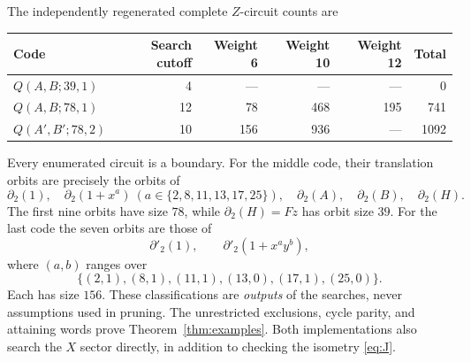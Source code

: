 The independently regenerated complete $Z$-circuit counts are
\begin{center}
\begin{tabular}{lrrrrr}
\toprule
Code & Search cutoff & Weight 6 & Weight 10 & Weight 12 & Total\\
\midrule
$Q(A,B;39,1)$ & 4 & --- & --- & --- & 0\\
$Q(A,B;78,1)$ & 12 & 78 & 468 & 195 & 741\\
$Q(A',B';78,2)$ & 10 & 156 & 936 & --- & 1092\\
\bottomrule
\end{tabular}
\end{center}
Every enumerated circuit is a boundary. For the middle code, their translation orbits are precisely the orbits of
\[
 \partial_2(1),\quad
 \partial_2(1+x^a)\ (a\in\{2,8,11,13,17,25\}),\quad
 \partial_2(A),\quad\partial_2(B),\quad\partial_2(H).
\]
The first nine orbits have size $78$, while $\partial_2(H)=Fz$ has orbit size $39$. For the last code the seven orbits are those of
\[
 \partial'_2(1),\qquad \partial'_2(1+x^ay^b),
\]
where $(a,b)$ ranges over
\[
 \{(2,1),(8,1),(11,1),(13,0),(17,1),(25,0)\}.
\]
Each has size $156$. These classifications are \emph{outputs} of the searches, never assumptions used in pruning. The unrestricted exclusions, cycle parity, and attaining words prove Theorem~\ref{thm:examples}. Both implementations also search the $X$ sector directly, in addition to checking the isometry \eqref{eq:J}.

